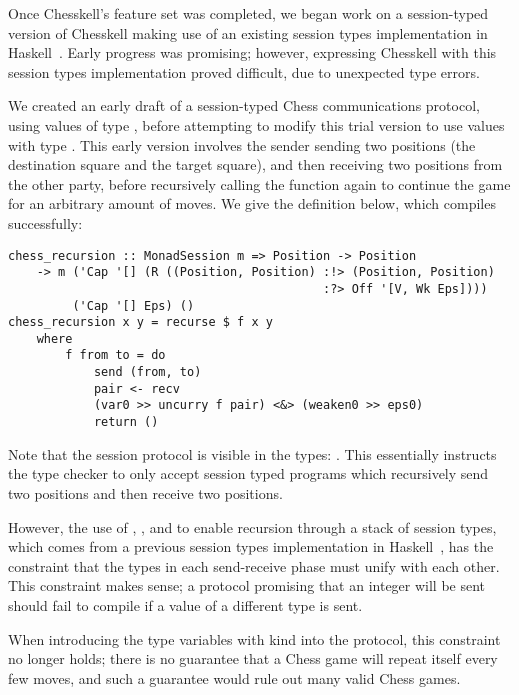 Once Chesskell's feature set was completed, we began work on a session-typed version of Chesskell making use of an existing session types implementation in Haskell~\cite{sesstypesincloudhaskell}. Early progress was promising; however, expressing Chesskell with this session types implementation proved difficult, due to unexpected type errors.

We created an early draft of a session-typed Chess communications protocol, using values of type , before attempting to modify this trial version to use  values with type . This early version involves the sender sending two positions (the destination square and the target square), and then receiving two positions from the other party, before recursively calling the function again to continue the game for an arbitrary amount of moves. We give the definition below, which compiles successfully:

\begin{lstlisting}
chess_recursion :: MonadSession m => Position -> Position
    -> m ('Cap '[] (R ((Position, Position) :!> (Position, Position)
                                            :?> Off '[V, Wk Eps])))
         ('Cap '[] Eps) ()
chess_recursion x y = recurse $ f x y
    where
        f from to = do
            send (from, to)
            pair <- recv
            (var0 >> uncurry f pair) <&> (weaken0 >> eps0)
            return ()
\end{lstlisting}

Note that the session protocol is visible in the types: . This essentially instructs the type checker to only accept session typed programs which recursively send two positions and then receive two positions.

However, the use of , , and  to enable recursion through a stack of session types, which comes from a previous session types implementation in Haskell~\cite{sessalmostnoclass}, has the constraint that the types in each send-receive phase must unify with each other. This constraint makes sense; a protocol promising that an integer will be sent should fail to compile if a value of a different type is sent.

When introducing the type variables with kind  into the protocol, this constraint no longer holds; there is no guarantee that a Chess game will repeat itself every few moves, and such a guarantee would rule out many valid Chess games.

